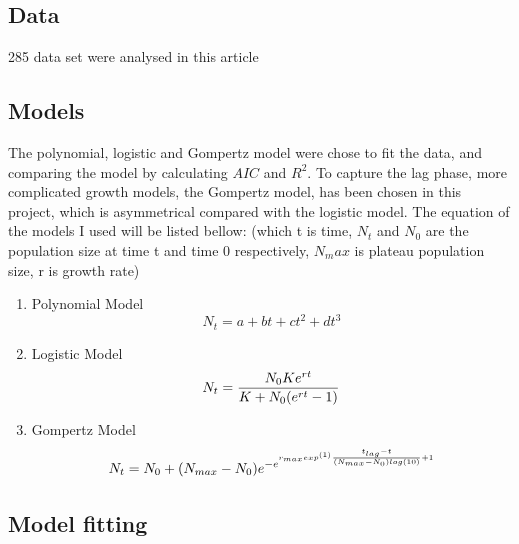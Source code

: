 \documentclass[11pt, a4paper]{article}
\begin{document}
\subsection{Data}

285 data set were analysed in this article 

\subsection{Models}
The polynomial, logistic and Gompertz model were chose to fit the data, and comparing the model by calculating $AIC$ and $R^2$. To capture the lag phase, more complicated growth models, the Gompertz model\cite{zwietering1990modeling}, has been chosen in this project, which is asymmetrical compared with the logistic model. The equation of the models I used will be listed bellow: (which t is time, $N_t$ and $N_0$ are the population size at time t and time 0 respectively, $N_max$ is plateau population size, r is growth rate)

\begin{enumerate}[1)]

\item Polynomial Model
\begin{equation*}
 N_t = a + bt + ct^2 + dt^3
\end{equation*}

\item Logistic Model
\begin{equation*}
 N_t= \frac{N_0Ke^{rt}}{K + N_0({e^{rt}-1})}\\
\end{equation*}

\item Gompertz Model
\begin{equation*}
 N_t= N_0 + (N_{max} - N_0) e^{-e^{r_{max} exp^{(1)} {\frac{t_{lag}-t}{(N_{max}-N_0)log(10)}\\} +1}} 
\end{equation*}

\end{enumerate}


\subsection{Model fitting}



\end{document}
